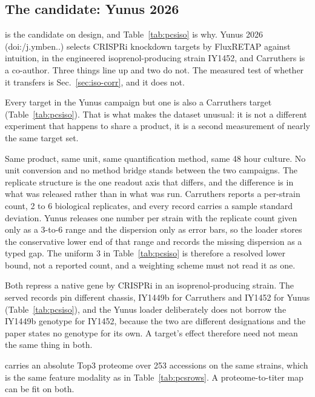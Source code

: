 \subsection{The candidate: Yunus 2026}\label{sec:iso-yunus}

 is the candidate on design, and Table~\ref{tab:pcsiso}
is why. Yunus 2026 (doi:/\allowbreak j.ymben..) selects CRISPRi knockdown targets by FluxRETAP against intuition, in the
engineered isoprenol-producing strain IY1452, and Carruthers is a co-author. Three
things line up and two do not. The measured test of whether it transfers is
Sec.~\ref{sec:iso-corr}, and it does not.

 Every target in the Yunus campaign but one
is also a Carruthers target (Table~\ref{tab:pcsiso}). That is what makes the dataset
unusual: it is not a different experiment that happens to share a product, it is a
second measurement of nearly the same target set.

 Same product, same unit, same
quantification method, same 48 hour culture. No unit conversion and no method bridge
stands between the two campaigns. The replicate structure is the one readout axis that
differs, and the difference is in what was released rather than in what was run.
Carruthers reports a per-strain count, 2 to 6 biological replicates, and every record
carries a sample standard deviation. Yunus releases one number per strain with the
replicate count given only as a 3-to-6 range and the dispersion only as error bars, so
the loader stores the conservative lower end of that range and records the missing
dispersion as a typed gap. The uniform 3 in Table~\ref{tab:pcsiso} is therefore a
resolved lower bound, not a reported count, and a weighting scheme must not read it as
one.

 Both repress a
native gene by CRISPRi in an isoprenol-producing strain. The served records pin
different chassis, IY1449b for Carruthers and IY1452 for Yunus (Table~\ref{tab:pcsiso}),
and the Yunus loader deliberately does not borrow the IY1449b genotype for IY1452,
because the two are different designations and the paper states no genotype for its
own. A target's effect therefore need not mean the same thing in both.

  carries an
absolute Top3 proteome over 253 accessions on the same strains, which is the same
feature modality as  in
Table~\ref{tab:pcsrows}. A proteome-to-titer map can be fit on both.

